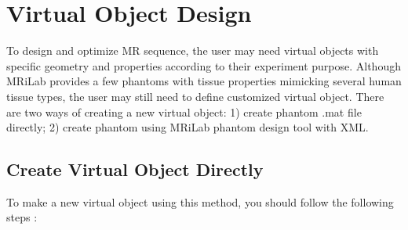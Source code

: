 \documentclass{book}%
\begin{document}
\section{Virtual Object Design} \label{chap:VirtualObjectDesign}

To design and optimize MR sequence, the user may need virtual objects with specific geometry and properties according to their experiment purpose. Although MRiLab provides a few phantoms with tissue properties mimicking several human tissue types, the user may still need to define customized virtual object. There are two ways of creating a new virtual object: 1) create phantom .mat file directly; 2) create phantom using MRiLab phantom design tool with XML.

\subsection{Create Virtual Object Directly}
To make a new virtual object using this method, you should follow the following steps :
\end{document}
